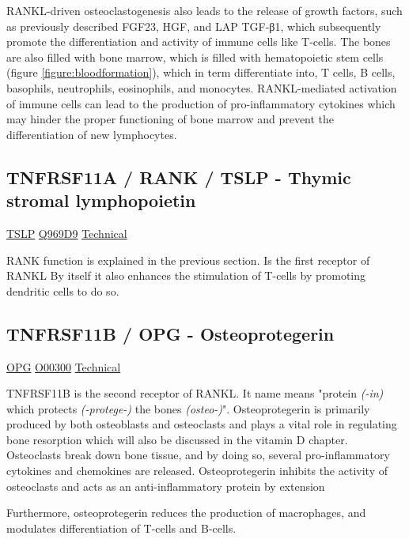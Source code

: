 RANKL-driven osteoclastogenesis also leads to the release of growth factors, such as previously described FGF23, HGF, and LAP TGF-β1, which subsequently promote the differentiation and activity of immune cells like T-cells. The bones are also filled with bone marrow, which is filled with hematopoietic stem cells (figure \ref{figure:bloodformation}), which in term differentiate into, T cells, B cells, basophils, neutrophils, eosinophils, and monocytes. RANKL-mediated activation of immune cells can lead to the production of pro-inflammatory cytokines which may hinder the proper functioning of bone marrow and prevent the differentiation of new lymphocytes.

\subsection{TNFRSF11A / RANK / TSLP - Thymic stromal lymphopoietin}

\href{https://en.wikipedia.org/wiki/Thymic \textunderscore stromal \textunderscore lymphopoietin}{TSLP}
\href{http://www.uniprot.org/uniprot/Q969D9}{Q969D9}
\href{https://olink.com/products-services/target/protein/?assayID=5062}{Technical}

RANK function is explained in the previous section. Is the first receptor of RANKL By itself it also enhances the stimulation of T-cells by promoting  dendritic cells to do so.

\subsection{TNFRSF11B / OPG - Osteoprotegerin}

\href{https://en.wikipedia.org/wiki/Osteoprotegerin}{OPG}
\href{http://www.uniprot.org/uniprot/O00300}{O00300}
\href{https://olink.com/products-services/target/protein/?assayID=5070}{Technical}

TNFRSF11B is the second receptor of RANKL. It name means "protein \textit{(-in)} which protects \textit{(-protege-)} the bones \textit{(osteo-)}". Osteoprotegerin is primarily produced by both osteoblasts and osteoclasts and plays a vital role in regulating bone resorption which will also be discussed in the vitamin D chapter. Osteoclasts break down bone tissue, and by doing so, several pro-inflammatory cytokines and chemokines are released. Osteoprotegerin inhibits the activity of osteoclasts and acts as an anti-inflammatory protein by extension

Furthermore, osteoprotegerin reduces the production of macrophages, and modulates differentiation of T-cells and B-cells.

